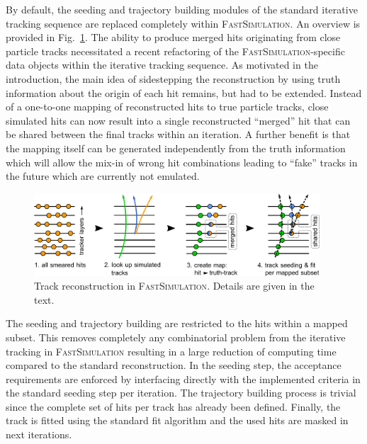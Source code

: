 \documentclass[a4paper]{jpconf}
\begin{document}
By default, the seeding and trajectory building modules of the standard iterative tracking sequence are replaced completely within \textsc{FastSimulation}. An overview is provided in Fig.~\ref{fig:tracking}. The ability to produce merged hits originating from close particle tracks necessitated a recent refactoring of the \textsc{FastSimulation}-specific data objects within the iterative tracking sequence. As motivated in the introduction, the main idea of sidestepping the reconstruction by using truth information about the origin of each hit remains, but had to be extended. Instead of a one-to-one mapping of reconstructed hits to true particle tracks, close simulated hits can now result into a single reconstructed ``merged'' hit that can be shared between the final tracks within an iteration. A further benefit is that the mapping itself can be generated independently from the truth information which will allow the mix-in of wrong hit combinations leading to ``fake'' tracks in the future which are currently not emulated.

\begin{figure}[htbp]
\begin{center}
\includegraphics[width=0.95\textwidth]{figures/tracking.pdf}
\caption{\label{fig:tracking}Track reconstruction in \textsc{FastSimulation}. Details are given in the text.}
\end{center}
\end{figure}

The seeding and trajectory building are restricted to the hits within a mapped subset. This removes completely any combinatorial problem from the iterative tracking in \textsc{FastSimulation} resulting in a large reduction of computing time compared to the standard reconstruction. In the seeding step, the acceptance requirements are enforced by interfacing directly with the implemented criteria in the standard seeding step per iteration. The trajectory building process is trivial since the complete set of hits per track has already been defined. Finally, the track is fitted using the standard fit algorithm and the used hits are masked in next iterations.
\end{document}
